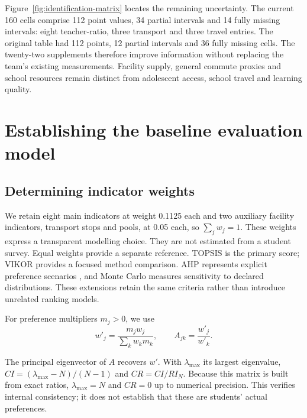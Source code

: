 Figure~\ref{fig:identification-matrix} locates the remaining uncertainty.
The current 160 cells comprise 112 point values, 34 partial intervals and
14 fully missing intervals: eight teacher-ratio, three transport and three
travel entries. The original table had 112 points, 12 partial
intervals and 36 fully missing cells. The twenty-two supplements therefore improve
information without replacing the team's existing measurements. Facility supply,
general commute proxies and school resources remain distinct from adolescent
access, school travel and learning quality.



\section{Establishing the baseline evaluation model}
\subsection{Determining indicator weights}
We retain eight main indicators at weight 0.1125 each and two auxiliary facility
indicators, transport stops and pools, at 0.05 each, so $\sum_jw_j=1$.
These weights express a transparent modelling choice. They are not estimated
from a student survey. Equal weights provide a separate reference.
TOPSIS is the primary score; VIKOR provides a focused method comparison.
AHP represents explicit preference scenarios \cite{saaty}, and Monte Carlo measures
sensitivity to declared distributions. These extensions retain the same
criteria rather than introduce unrelated ranking models.

For preference multipliers $m_j>0$, we use
\begin{equation}
 w'_j=\frac{m_jw_j}{\sum_kw_km_k},\qquad A_{jk}=\frac{w'_j}{w'_k}.
 \label{eq:weights}
\end{equation}
\begin{samepage}
The principal eigenvector of $A$ recovers $w'$. With $\lambda_{\max}$ its
largest eigenvalue, $CI=(\lambda_{\max}-N)/(N-1)$ and $CR=CI/RI_N$.
Because this matrix is built from exact ratios, $\lambda_{\max}=N$ and
$CR=0$ up to numerical precision. This verifies internal consistency;
it does not establish that these are students' actual preferences.
\par\end{samepage}

